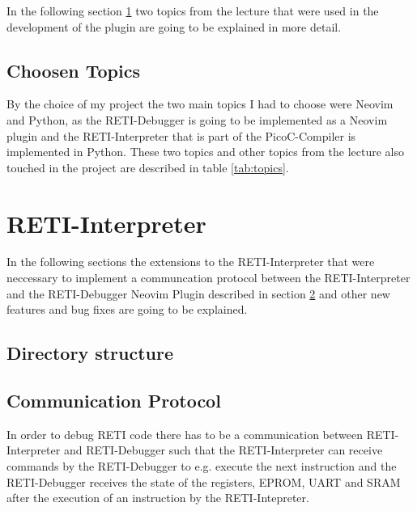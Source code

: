 \documentclass{report}
\begin{document}
In the following section \ref{sec:choosen_topics} two topics from the lecture that were used in the development of the plugin are going to be explained in more detail.

\section{Choosen Topics}
\label{sec:choosen_topics}

By the choice of my project the two main topics I had to choose were \alert{Neovim} and \alert{Python}, as the RETI-Debugger is going to be implemented as a \alert{Neovim plugin} and the RETI-Interpreter that is part of the PicoC-Compiler is implemented in Python. These two topics and other topics from the lecture also touched in the project are described in table \ref{tab:topics}.


\chapter{RETI-Interpreter}
\label{sec:reti-interpreter}

In the following sections the extensions to the RETI-Interpreter that were neccessary to implement a communcation protocol between the RETI-Interpreter and the RETI-Debugger Neovim Plugin  described in section \ref{sec:reti-interpreter}  and other new features and bug fixes are going to be explained.

\section{Directory structure}

\section{Communication Protocol}

\sloppy

In order to debug RETI code there has to be a communication between RETI-Interpreter and RETI-Debugger such that the RETI-Interpreter can receive commands by the RETI-Debugger to e.g. execute the next instruction and the RETI-Debugger receives the state of the registers, EPROM, UART and SRAM after the execution of an instruction by the RETI-Intepreter. 
\end{document}
